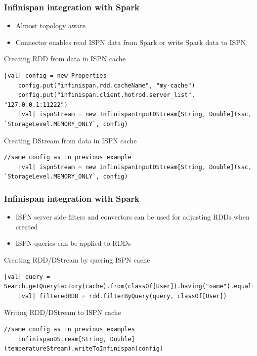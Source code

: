 \documentclass[10pt,utf8]{beamer}
\begin{document}
\begin{frame}[fragile]
	\frametitle{Infinispan integration with Spark}
	\begin{itemize}
		\item Almost topology aware
		\item Connector enables read ISPN data from Spark or write Spark data to ISPN
	\end{itemize}
	\vspace{0.5cm}
	Creating RDD from data in ISPN cache
	\begin{lstlisting}[style=Java]
    |val| config = new Properties
    config.put("infinispan.rdd.cacheName", "my-cache")
    config.put("infinispan.client.hotrod.server_list", "127.0.0.1:11222")
    |val| ispnStream = new InfinispanInputDStream[String, Double](ssc, `StorageLevel.MEMORY_ONLY`, config)  
	\end{lstlisting}
	\vspace{0.5cm}
	Creating DStream from data in ISPN cache
	\begin{lstlisting}[style=Java]
    //same config as in previous example
    |val| ispnStream = new InfinispanInputDStream[String, Double](ssc, `StorageLevel.MEMORY_ONLY`, config)  
	\end{lstlisting}
\end{frame}

\begin{frame}[fragile]
	\frametitle{Infinispan integration with Spark}
	\begin{itemize}
	 \item ISPN server side filters and convertors can be used for adjusting RDDs when created 
	 \item ISPN queries can be applied to RDDs
	\end{itemize}
	\vspace{0.5cm}
	Creating RDD/DStream by quering ISPN cache
	\begin{lstlisting}[style=Java]
    |val| query = Search.getQueryFactory(cache).from(classOf[User]).having("name").equal("Vojtech").toBuilder[RemoteQuery].build
    |val| filteredRDD = rdd.filterByQuery(query, classOf[User])
	\end{lstlisting}
	\vspace{0.5cm}
	Writing RDD/DStream to ISPN cache
		\begin{lstlisting}[style=Java]
    //same config as in previous examples
    InfinispanDStream[String, Double](temperatureStream).writeToInfinispan(config)
	\end{lstlisting}
\end{frame}
\end{document}
